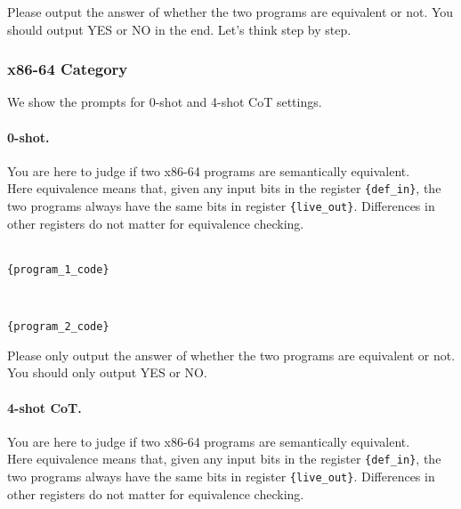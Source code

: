       Please output the answer of whether the two programs are equivalent or not. You should output YES or NO in the end. Let's think step by step.



\subsubsection{x86-64 Category}
We show the prompts for 0-shot and 4-shot CoT settings.

\paragraph{0-shot.} You are here to judge if two x86-64 programs are semantically equivalent.\\
    Here equivalence means that, given any input bits in the register \texttt{\{def\_in\}}, the two programs always have the same bits in register \texttt{\{live\_out\}}. Differences in other registers do not matter for equivalence checking.\\

\text{[Program 1]:}\\
\begin{lstlisting}
{program_1_code}
\end{lstlisting}

\text{[Program 2]:}\\
\begin{lstlisting}
{program_2_code}
\end{lstlisting}

Please only output the answer of whether the two programs are equivalent or not. You should only output YES or NO.\\

\paragraph{4-shot CoT.} You are here to judge if two x86-64 programs are semantically equivalent.\\
    Here equivalence means that, given any input bits in the register \texttt{\{def\_in\}}, the two programs always have the same bits in register \texttt{\{live\_out\}}. Differences in other registers do not matter for equivalence checking.\\

